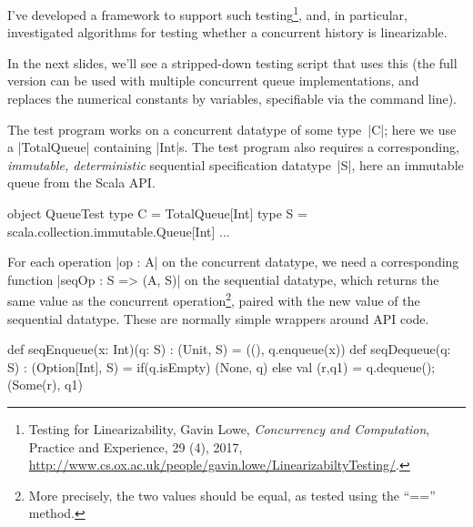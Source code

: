 
\begin{slide}

I've developed a framework to support such testing\footnote{{Testing
    for Linearizability}, Gavin Lowe, \textit{Concurrency and Computation},
    Practice and Experience, 29 (4), 2017,
  \url{http://www.cs.ox.ac.uk/people/gavin.lowe/LinearizabiltyTesting/}.},
and, in particular, investigated algorithms for testing whether a concurrent
history is linearizable.

In the next slides, we'll see a stripped-down testing script that uses this
(the full version can be used with multiple concurrent queue implementations,
and replaces the numerical constants by variables, specifiable via the command
line).

\vfill
\end{slide}


\begin{slide}

The test program works on a concurrent datatype of some type~|C|; here we use
a |TotalQueue| containing |Int|s.  The test program
also requires a corresponding, \emph{immutable, deterministic}
sequential specification datatype~|S|, here an immutable queue from the Scala
API.
%
\begin{scala}
object QueueTest{
  type C = TotalQueue[Int]
  type S = scala.collection.immutable.Queue[Int]
  ...
}
\end{scala}
\end{slide}


\begin{slide}

For each operation |op : A| on the concurrent datatype, we need a
corresponding function |seqOp : S => (A, S)| on the sequential datatype, which
returns the same value as the concurrent operation\footnote{More precisely,
  the two values should be equal, as tested using the ``{\scalashape ==}''
  method.}, paired with the new value of the sequential datatype.  These are
normally simple wrappers around API code.
%
\begin{scala}
  def seqEnqueue(x: Int)(q: S) : (Unit, S) = ((), q.enqueue(x))
  def seqDequeue(q: S) : (Option[Int], S) =   
    if(q.isEmpty) (None, q) 
    else{ val (r,q1) = q.dequeue(); (Some(r), q1) }
\end{scala}
\vfill
\end{slide}

